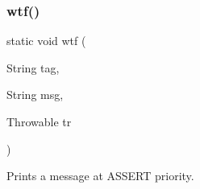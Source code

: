 \subsubsection{\texorpdfstring{wtf()}{wtf()}\hspace{0.1cm}{\footnotesize\ttfamily [1/3]}}
{\footnotesize\ttfamily static void wtf (\begin{DoxyParamCaption}\item[{String}]{tag,  }\item[{String}]{msg,  }\item[{Throwable}]{tr }\end{DoxyParamCaption})\hspace{0.3cm}{\ttfamily [static]}}



Prints a message at A\+S\+S\+E\+RT priority. 


